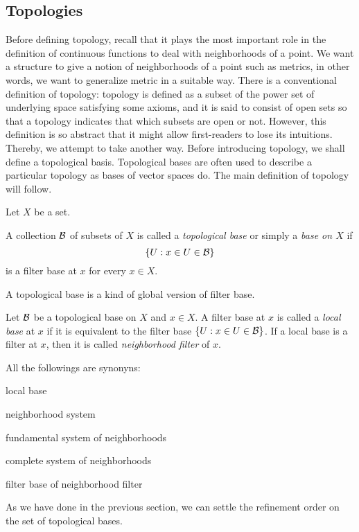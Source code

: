 \subsection{Topologies}
Before defining topology, recall that it plays the most important role in the definition of continuous functions to deal with neighborhoods of a point.
We want a structure to give a notion of neighborhoods of a point such as metrics, in other words, we want to generalize metric in a suitable way.
There is a conventional definition of topology: topology is defined as a subset of the power set of underlying space satisfying some axioms, and it is said to consist of open sets so that a topology indicates that which subsets are open or not.
However, this definition is so abstract that it might allow first-readers to lose its intuitions.
Thereby, we attempt to take another way.
Before introducing topology, we shall define a topological basis.
Topological bases are often used to describe a particular topology as bases of vector spaces do.
The main definition of topology will follow.

Let $X$ be a set.
\begin{defn}
A collection $\mathcal{B}$ of subsets of $X$ is called a \emph{topological base} or simply a \emph{base on $X$} if
\[\{U:x\in U\in\mathcal{B}\}\]
is a filter base at $x$ for every $x\in X$.
\end{defn}

A topological base is a kind of global version of filter base.

\begin{defn}
Let $\mathcal{B}$ be a topological base on $X$ and $x\in X$.
A filter base at $x$ is called a \emph{local base} at $x$ if it is equivalent to the filter base $\{U:x\in U\in\mathcal{B}\}$.
If a local base is a filter at $x$, then it is called \emph{neighborhood filter} of $x$.
\end{defn}
All the followings are synonyns:
\begin{cond}
\item local base
\item neighborhood system
\item fundamental system of neighborhoods
\item complete system of neighborhoods
\item filter base of neighborhood filter
\end{cond}

As we have done in the previous section, we can settle the refinement order on the set of topological bases.

